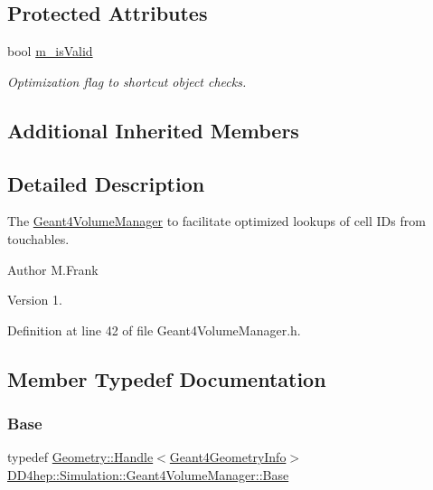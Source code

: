 \subsection*{Protected Attributes}
\begin{DoxyCompactItemize}
\item 
bool \hyperlink{class_d_d4hep_1_1_simulation_1_1_geant4_volume_manager_abbc8ba6689ff382f2803382ccaf3d6d6}{m\+\_\+is\+Valid}
\begin{DoxyCompactList}\small\item\em Optimization flag to shortcut object checks. \end{DoxyCompactList}\end{DoxyCompactItemize}
\subsection*{Additional Inherited Members}


\subsection{Detailed Description}
The \hyperlink{class_d_d4hep_1_1_simulation_1_1_geant4_volume_manager}{Geant4\+Volume\+Manager} to facilitate optimized lookups of cell I\+Ds from touchables. 

\begin{DoxyAuthor}{Author}
M.\+Frank 
\end{DoxyAuthor}
\begin{DoxyVersion}{Version}
1. 
\end{DoxyVersion}


Definition at line 42 of file Geant4\+Volume\+Manager.\+h.



\subsection{Member Typedef Documentation}
\hypertarget{class_d_d4hep_1_1_simulation_1_1_geant4_volume_manager_a7c19ae032d35b5c68d35029f28fc1586}{}\label{class_d_d4hep_1_1_simulation_1_1_geant4_volume_manager_a7c19ae032d35b5c68d35029f28fc1586} 
\subsubsection{\texorpdfstring{Base}{Base}}
{\footnotesize\ttfamily typedef \hyperlink{class_d_d4hep_1_1_handle}{Geometry\+::\+Handle}$<$\hyperlink{class_d_d4hep_1_1_simulation_1_1_geant4_geometry_info}{Geant4\+Geometry\+Info}$>$ \hyperlink{class_d_d4hep_1_1_simulation_1_1_geant4_volume_manager_a7c19ae032d35b5c68d35029f28fc1586}{D\+D4hep\+::\+Simulation\+::\+Geant4\+Volume\+Manager\+::\+Base}}



